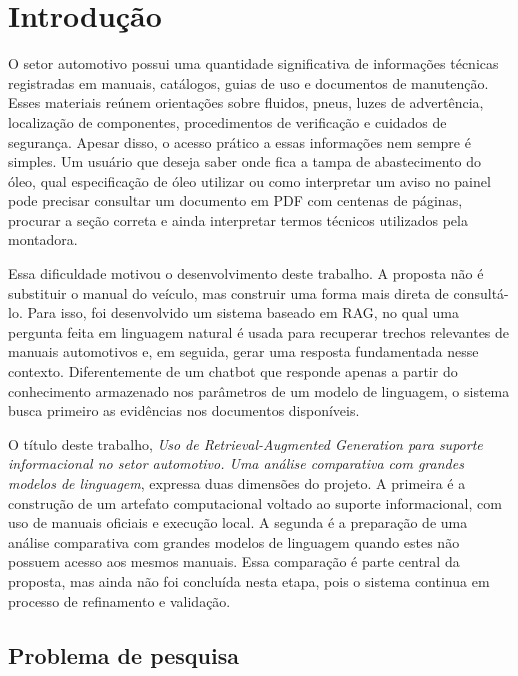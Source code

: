 \chapter{Introdução}
\label{cap:introducao}

O setor automotivo possui uma quantidade significativa de informações técnicas registradas em manuais, catálogos, guias de uso e documentos de manutenção. Esses materiais reúnem orientações sobre fluidos, pneus, luzes de advertência, localização de componentes, procedimentos de verificação e cuidados de segurança. Apesar disso, o acesso prático a essas informações nem sempre é simples. Um usuário que deseja saber onde fica a tampa de abastecimento do óleo, qual especificação de óleo utilizar ou como interpretar um aviso no painel pode precisar consultar um documento em \acf{PDF} com centenas de páginas, procurar a seção correta e ainda interpretar termos técnicos utilizados pela montadora.

Essa dificuldade motivou o desenvolvimento deste trabalho. A proposta não é substituir o manual do veículo, mas construir uma forma mais direta de consultá-lo. Para isso, foi desenvolvido um sistema baseado em \acf{RAG}, no qual uma pergunta feita em linguagem natural é usada para recuperar trechos relevantes de manuais automotivos e, em seguida, gerar uma resposta fundamentada nesse contexto. Diferentemente de um chatbot que responde apenas a partir do conhecimento armazenado nos parâmetros de um modelo de linguagem, o sistema busca primeiro as evidências nos documentos disponíveis.

O título deste trabalho, \textit{Uso de Retrieval-Augmented Generation para suporte informacional no setor automotivo. Uma análise comparativa com grandes modelos de linguagem}, expressa duas dimensões do projeto. A primeira é a construção de um artefato computacional voltado ao suporte informacional, com uso de manuais oficiais e execução local. A segunda é a preparação de uma análise comparativa com grandes modelos de linguagem quando estes não possuem acesso aos mesmos manuais. Essa comparação é parte central da proposta, mas ainda não foi concluída nesta etapa, pois o sistema continua em processo de refinamento e validação.

\section{Problema de pesquisa}
\label{sec:problema}

